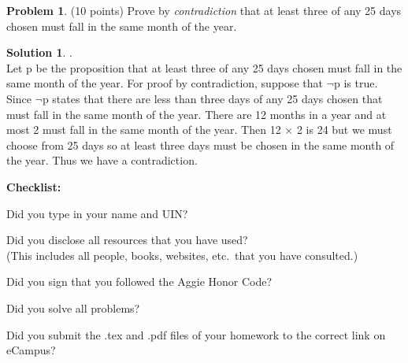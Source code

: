 \documentclass{article}
\theoremstyle{definition}
\newtheorem{problem}{Problem}
\newtheorem*{solution}{Solution}
\newcommand{\checklist}{\noindent\textbf{Checklist:}
\begin{compactitem}[$\Box$] 
\item Did you type in your name and UIN? 
\item Did you disclose all resources that you have used? \\
(This includes all people, books, websites, etc.\ that you have consulted.)
\item Did you sign that you followed the Aggie Honor Code? 
\item Did you solve all problems? 
\item Did you submit  the .tex and .pdf files of your homework to the correct link on eCampus? 
\end{compactitem}
}
\begin{document}
\begin{problem} (10 points) Prove by \textit{contradiction} that
at least three of any 25 days chosen must fall in the same month 
of the year.
\end{problem}
\begin{solution} .\\
Let p be the proposition that at least three of any 25 days chosen must fall in the same month of the year. For proof by contradiction, suppose that $\neg$p is true. Since $\neg$p states that there are less than three days of any 25 days chosen that must fall in the same month of the year. There are 12 months in a year and at most 2 must fall in the same month of the year. Then 12 $\times$ 2 is 24 but we must choose from 25 days so at least three days must be chosen in the same month of the year. Thus we have a contradiction.
\end{solution} 

\goodbreak
\checklist
\end{document}
